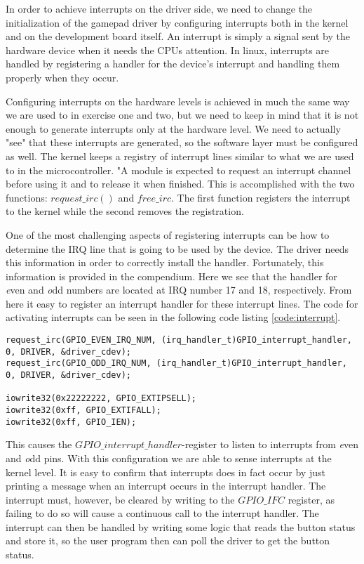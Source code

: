 In order to achieve interrupts on the driver side, we need to change the initialization of the gamepad driver by configuring interrupts both in the kernel and on the development board itself. An interrupt is simply a signal sent by the hardware device when it needs the CPUs attention. In linux, interrupts are handled by registering a handler for the device's interrupt and handling them properly when they occur. 

Configuring interrupts on the hardware levels is achieved in much the same way we are used to in exercise one and two, but we need to keep in mind that it is not enough to generate interrupts only at the hardware level. We need to actually "see" that these interrupts are generated, so the software layer must be configured as well. The kernel keeps a registry of interrupt lines similar to what we are used to in the microcontroller. "A module is expected to request an interrupt channel before using it and to release it when finished. This is accomplished with the two functions: $request\_irc()$ and $free\_irc$. The first function registers the interrupt to the kernel while the second removes the registration. 

One of the most challenging aspects of registering interrupts can be how to determine the IRQ line that is going to be used by the device\cite{linux}. The driver needs this information in order to correctly install the handler. Fortunately, this information is provided in the compendium. Here we see that the handler for {\emph even} and {\emph odd} numbers are located at IRQ number 17 and 18, respectively. From here it easy to register an interrupt handler for these interrupt lines. The code for activating interrupts can be seen in the following code listing \ref{code:interrupt}.

\begin{lstlisting}[caption=Activate interupts, label=code:interrupt]
request_irc(GPIO_EVEN_IRQ_NUM, (irq_handler_t)GPIO_interrupt_handler, 0, DRIVER, &driver_cdev);
request_irc(GPIO_ODD_IRQ_NUM, (irq_handler_t)GPIO_interrupt_handler, 0, DRIVER, &driver_cdev);

iowrite32(0x22222222, GPIO_EXTIPSELL);
iowrite32(0xff, GPIO_EXTIFALL);
iowrite32(0xff, GPIO_IEN);
\end{lstlisting}



This causes the $GPIO\_interrupt\_handler$-register to listen to interrupts from {\emph even} and {\emph odd} pins. With this configuration we are able to sense interrupts at the kernel level. It is easy to confirm that interrupts does in fact occur by just printing a message when an interrupt occurs in the interrupt handler. The interrupt must, however, be cleared by writing to the $GPIO\_IFC$ register, as failing to do so will cause a continuous call to the interrupt handler. The interrupt can then be handled by writing some logic that reads the button status and store it, so the user program then can poll the driver to get the button status. 


